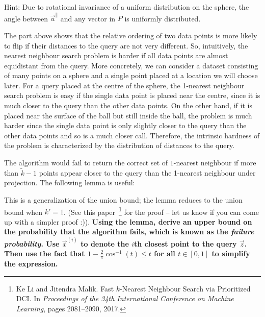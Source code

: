 \documentclass[preview]{standalone}
\begin{document}
\begin{Parts}

Hint: Due to rotational invariance of a uniform distribution on the sphere, the angle between $\vec{u}^{\parallel}$ and any vector in $P$ is uniformly distributed.



\Part The part above shows that the relative ordering of two data points is more likely to flip if their distances to the query are not very different. So, intuitively, the nearest neighbour search problem is harder if all data points are almost equidistant from the query. More concretely, we can consider a dataset consisting of many points on a sphere and a single point placed at a location we will choose later. For a query placed at the centre of the sphere, the 1-nearest neighbour search problem is easy if the single data point is placed near the centre, since it is much closer to the query than the other data points. On the other hand, if it is placed near the surface of the ball but still inside the ball, the problem is much harder since the single data point is only slightly closer to the query than the other data points and so is a much closer call. Therefore, the intrinsic hardness of the problem is characterized by the distribution of distances to the query.

The algorithm would fail to return the correct set of $1$-nearest neighbour if more than $\tilde{k}-1$ points appear closer to the query than the 1-nearest neighbour under projection. The following lemma is useful:


This is a generalization of the union bound; the lemma reduces to the union bound when $k'=1$. (See this paper~\footnote{Ke Li and Jitendra Malik. Fast $k$-Nearest Neighbour Search via Prioritized DCI. In \emph{Proceedings of the 34th International Conference on Machine Learning}, pages 2081--2090, 2017.} for the proof -- let us know if you can come up with a simpler proof :)). {\bf Using the lemma, derive an upper bound on the probability that the algorithm fails, which is known as the \emph{failure probability}. Use $\vec{x}^{(i)}$ to denote the $i$th closest point to the query $\vec{z}$. Then use the fact that $1-\frac{2}{\pi}\cos^{-1}(t)\leq t$ for all $t\in[0,1]$ to simplify the expression.}


\end{Parts}
\end{document}
